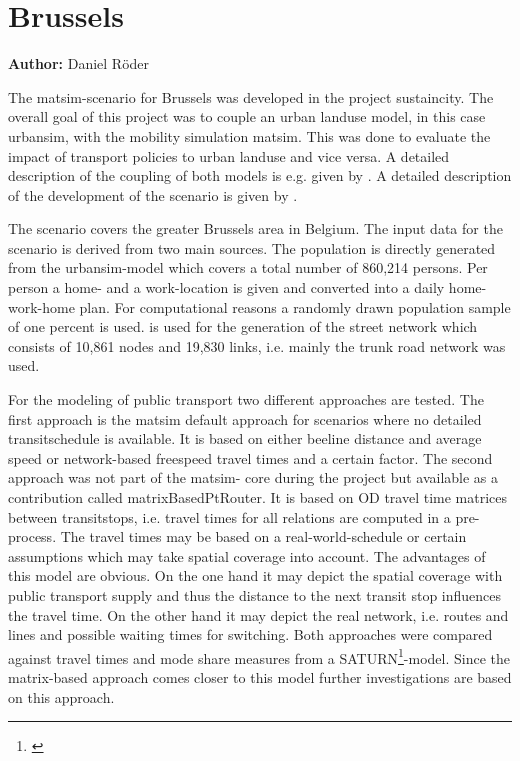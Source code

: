 \section{Brussels}
\label{ch:scenarios:brussels}
\hfill \textbf{Author:} Daniel Röder

The \acrshort{matsim}-scenario for Brussels was developed in the project 
\acrshort{sustaincity}. The overall goal of this project was to couple an 
urban landuse model, in this case \acrshort{urbansim}, with the mobility 
simulation \acrshort{matsim}. This was done to evaluate the impact of 
transport policies to urban landuse and vice versa. A detailed description of 
the coupling of both models is e.g. given by \citet{Nicolai2013PhD}. A 
detailed description of the development of the scenario is given by 
\citet{RoederNagel2013SketchPlanningBrussels}.

The scenario covers the greater Brussels area in Belgium. The input data for 
the scenario is derived from two main sources. The population is directly 
generated from the \acrshort{urbansim}-model which covers a total number of 
860,214 persons. Per person a home- and a work-location is given and 
converted into a daily home-work-home plan. For computational reasons a 
randomly drawn population sample of one percent is used. 
\citet{OpenStreetMap2014} is used for the generation of the street network 
which consists of 10,861 nodes and 19,830 links, i.e. mainly the trunk road 
network was used.

For the modeling of public transport two different approaches are tested. The 
first approach is the \acrshort{matsim} default approach for scenarios where 
no detailed transitschedule is available. It is based on either beeline 
distance and average speed or network-based freespeed travel times and a 
certain factor. The second approach was not part of the \acrshort{matsim}-
core during the project but available as a contribution called 
matrixBasedPtRouter. It is based on OD travel time matrices between 
transitstops, i.e. travel times for all relations are computed in a pre-
process. The travel times may be based on a real-world-schedule or certain 
assumptions which may take spatial coverage into account. The advantages of 
this model are obvious. On the one hand it may depict the spatial coverage 
with public transport supply and thus the distance to the next transit stop 
influences the travel time. On the other hand it may depict the real network, 
i.e. routes and lines and possible waiting times for switching. Both 
approaches were compared against travel times and mode share measures from a 
SATURN\footnote{\citep{SATURN_Webpage_2014}}-model. Since the matrix-based 
approach comes closer to this model further investigations are based on this 
approach.

